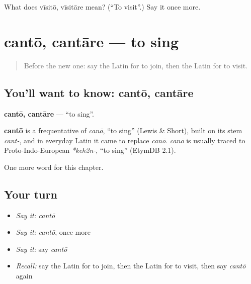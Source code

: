 \begin{tcolorbox}[breakable,colback=teal!4,colframe=teal!35!black,title={Before you move on}]
What does vīsitō, vīsitāre mean? (\textquotedblleft{}To visit\textquotedblright{}.) Say it once more.
\end{tcolorbox}
\section[cantō, cantāre]{cantō, cantāre — to sing}

\label{lesson:LA-C154-canto}



\begin{quote}
Before the new one: say the Latin for to join, then the Latin for to visit.
\end{quote}

\subsection*{You'll want to know: cantō, cantāre}
\textbf{cantō, cantāre} — \textquotedblleft{}to sing\textquotedblright{}.

\begin{cousinweb}
\textbf{cantō} is a frequentative of \emph{canō}, \textquotedblleft{}to sing\textquotedblright{} (Lewis \& Short), built on its stem \emph{cant-}, and in everyday Latin it came to replace \emph{canō}. \emph{canō} is usually traced to Proto-Indo-European \emph{*keh2n-}, \textquotedblleft{}to sing\textquotedblright{} (EtymDB 2.1).
\end{cousinweb}

\begin{grammarlens}[title={What you've built}]
One more word for this chapter.
\end{grammarlens}

\subsection*{Your turn}
\begin{itemize}
\raggedright
  \item \emph{Say it:} \emph{cantō}
  \item \emph{Say it:} \emph{cantō}, once more
  \item \emph{Say it:} say \emph{cantō}
  \item \emph{Recall:} say the Latin for to join, then the Latin for to visit, then say \emph{cantō} again
\end{itemize}

